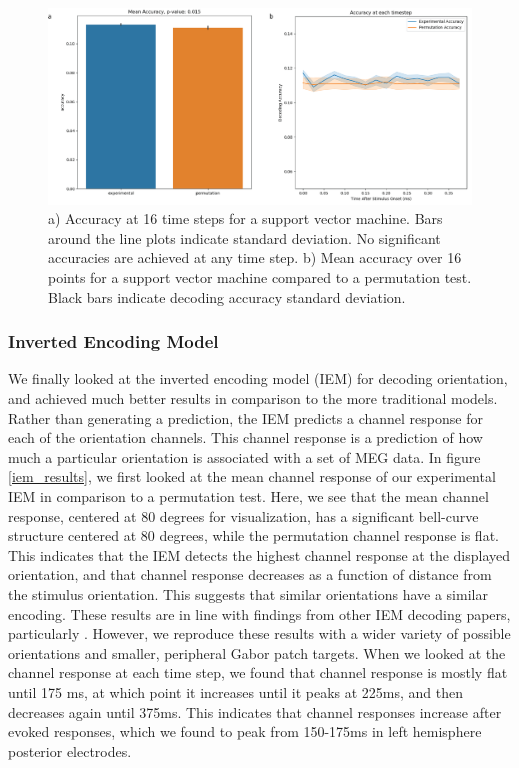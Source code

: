 \documentclass[../main.tex]{subfiles}
\begin{document}
\begin{figure}
    \centering
    \includegraphics[scale=0.7]{figures/results/svm_sensor_accuracy.png}
    \caption{a) Accuracy at 16 time steps for a support vector machine.  Bars around the line plots indicate standard deviation. No significant accuracies are achieved at any time step. b) Mean accuracy over 16 points for a support vector machine compared to a permutation test. Black bars indicate decoding accuracy standard deviation.}
    \label{svm_sensor_accuracy}
\end{figure}

\subsubsection{Inverted Encoding Model}
We finally looked at the inverted encoding model (IEM) for decoding orientation, and achieved much better results in comparison to the more traditional models. Rather than generating a prediction, the IEM predicts a channel response for each of the orientation channels. This channel response is a prediction of how much a particular orientation is associated with a set of MEG data. In figure \ref{iem_results}, we first looked at the mean channel response of our experimental IEM in comparison to a permutation test. Here, we see that the mean channel response, centered at 80 degrees for visualization, has a significant bell-curve structure centered at 80 degrees, while the permutation channel response is flat. This indicates that the IEM detects the highest channel response at the displayed orientation, and that channel response decreases as a function of distance from the stimulus orientation. This suggests that similar orientations have a similar encoding. These results are in line with findings from other IEM decoding papers, particularly \cite{GARCIA2013515}. However, we reproduce these results with a wider variety of possible orientations and smaller, peripheral Gabor patch targets. When we looked at the channel response at each time step, we found that channel response is mostly flat until 175 ms, at which point it increases until it peaks at 225ms, and then decreases again until 375ms. This indicates that channel responses increase after evoked responses, which we found to peak from 150-175ms in left hemisphere posterior electrodes.
\end{document}
